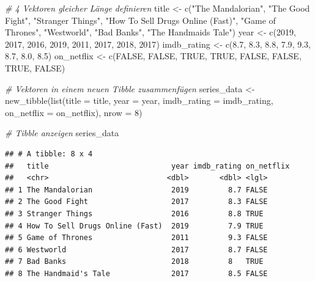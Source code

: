 \documentclass[
]{book}
\newenvironment{Shaded}{\begin{snugshade}}{\end{snugshade}}
\newcommand{\AttributeTok}[1]{\textcolor[rgb]{0.77,0.63,0.00}{#1}}
\newcommand{\CommentTok}[1]{\textcolor[rgb]{0.56,0.35,0.01}{\textit{#1}}}
\newcommand{\ConstantTok}[1]{\textcolor[rgb]{0.00,0.00,0.00}{#1}}
\newcommand{\DecValTok}[1]{\textcolor[rgb]{0.00,0.00,0.81}{#1}}
\newcommand{\FloatTok}[1]{\textcolor[rgb]{0.00,0.00,0.81}{#1}}
\newcommand{\FunctionTok}[1]{\textcolor[rgb]{0.00,0.00,0.00}{#1}}
\newcommand{\NormalTok}[1]{#1}
\newcommand{\OtherTok}[1]{\textcolor[rgb]{0.56,0.35,0.01}{#1}}
\newcommand{\StringTok}[1]{\textcolor[rgb]{0.31,0.60,0.02}{#1}}
\begin{document}
\begin{Shaded}
\begin{Highlighting}[]
\CommentTok{\# 4 Vektoren gleicher Länge definieren}
\NormalTok{title        }\OtherTok{\textless{}{-}} \FunctionTok{c}\NormalTok{(}\StringTok{"The Mandalorian"}\NormalTok{, }\StringTok{"The Good Fight"}\NormalTok{, }\StringTok{"Stranger Things"}\NormalTok{, }
                  \StringTok{"How To Sell Drugs Online (Fast)"}\NormalTok{, }\StringTok{"Game of Thrones"}\NormalTok{,}
                  \StringTok{"Westworld"}\NormalTok{, }\StringTok{"Bad Banks"}\NormalTok{, }\StringTok{"The Handmaid\textquotesingle{}s Tale"}\NormalTok{)}
\NormalTok{year         }\OtherTok{\textless{}{-}} \FunctionTok{c}\NormalTok{(}\DecValTok{2019}\NormalTok{, }\DecValTok{2017}\NormalTok{, }\DecValTok{2016}\NormalTok{, }\DecValTok{2019}\NormalTok{, }\DecValTok{2011}\NormalTok{, }\DecValTok{2017}\NormalTok{, }\DecValTok{2018}\NormalTok{, }\DecValTok{2017}\NormalTok{)}
\NormalTok{imdb\_rating  }\OtherTok{\textless{}{-}} \FunctionTok{c}\NormalTok{(}\FloatTok{8.7}\NormalTok{, }\FloatTok{8.3}\NormalTok{, }\FloatTok{8.8}\NormalTok{, }\FloatTok{7.9}\NormalTok{, }\FloatTok{9.3}\NormalTok{, }\FloatTok{8.7}\NormalTok{, }\FloatTok{8.0}\NormalTok{, }\FloatTok{8.5}\NormalTok{)}
\NormalTok{on\_netflix   }\OtherTok{\textless{}{-}} \FunctionTok{c}\NormalTok{(}\ConstantTok{FALSE}\NormalTok{, }\ConstantTok{FALSE}\NormalTok{, }\ConstantTok{TRUE}\NormalTok{, }\ConstantTok{TRUE}\NormalTok{, }\ConstantTok{FALSE}\NormalTok{, }\ConstantTok{FALSE}\NormalTok{, }\ConstantTok{TRUE}\NormalTok{, }\ConstantTok{FALSE}\NormalTok{)}

\CommentTok{\# Vektoren in einem neuen Tibble zusammenfügen}
\NormalTok{series\_data }\OtherTok{\textless{}{-}} \FunctionTok{new\_tibble}\NormalTok{(}\FunctionTok{list}\NormalTok{(}\AttributeTok{title =}\NormalTok{ title, }
                          \AttributeTok{year =}\NormalTok{ year, }
                          \AttributeTok{imdb\_rating =}\NormalTok{ imdb\_rating, }
                          \AttributeTok{on\_netflix =}\NormalTok{ on\_netflix),}
                          \AttributeTok{nrow =} \DecValTok{8}\NormalTok{) }

\CommentTok{\# Tibble anzeigen}
\NormalTok{series\_data}
\end{Highlighting}
\end{Shaded}

\begin{verbatim}
## # A tibble: 8 x 4
##   title                            year imdb_rating on_netflix
##   <chr>                           <dbl>       <dbl> <lgl>     
## 1 The Mandalorian                  2019         8.7 FALSE     
## 2 The Good Fight                   2017         8.3 FALSE     
## 3 Stranger Things                  2016         8.8 TRUE      
## 4 How To Sell Drugs Online (Fast)  2019         7.9 TRUE      
## 5 Game of Thrones                  2011         9.3 FALSE     
## 6 Westworld                        2017         8.7 FALSE     
## 7 Bad Banks                        2018         8   TRUE      
## 8 The Handmaid's Tale              2017         8.5 FALSE
\end{verbatim}
\end{document}
